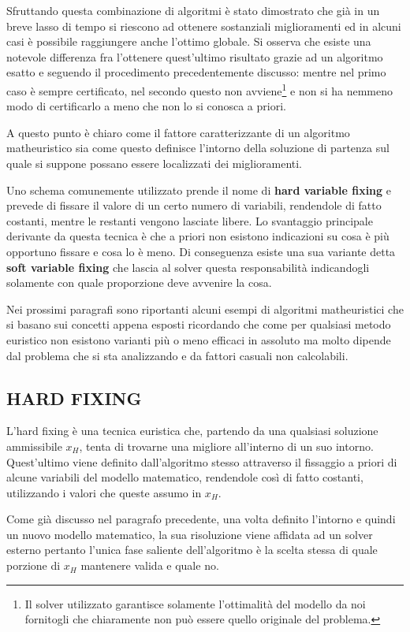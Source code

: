 \documentclass[11pt]{article}
\begin{document}
Sfruttando questa combinazione di algoritmi è stato dimostrato che già in un breve lasso di tempo si riescono ad ottenere sostanziali miglioramenti ed in alcuni casi è possibile raggiungere anche l'ottimo globale. Si osserva che esiste una notevole differenza fra l'ottenere quest'ultimo risultato grazie ad un algoritmo esatto e seguendo il procedimento precedentemente discusso: mentre nel primo caso è sempre certificato, nel secondo questo non avviene\footnote{Il solver utilizzato garantisce solamente l'ottimalità del modello da noi fornitogli che chiaramente non può essere quello originale del problema.} e non si ha nemmeno modo di certificarlo a meno che non lo si conosca a priori.

A questo punto è chiaro come il fattore caratterizzante di un algoritmo matheuristico sia come questo definisce l'intorno della soluzione di partenza sul quale si suppone possano essere localizzati dei miglioramenti. 

Uno schema comunemente utilizzato prende il nome di \textbf{hard variable fixing} e prevede di fissare il valore di un certo numero di variabili, rendendole di fatto costanti, mentre le restanti vengono lasciate libere. Lo svantaggio principale derivante da questa tecnica è che a priori non esistono indicazioni su cosa è più opportuno fissare e cosa lo è meno. Di conseguenza esiste una sua variante detta \textbf{soft variable fixing} che lascia al solver questa responsabilità indicandogli solamente con quale proporzione deve avvenire la cosa.

Nei prossimi paragrafi sono riportanti alcuni esempi di algoritmi matheuristici che si basano sui concetti appena esposti ricordando che come per qualsiasi metodo euristico non esistono varianti più o meno efficaci in assoluto ma molto dipende dal problema che si sta analizzando e da fattori casuali non calcolabili.

\subsection*{HARD FIXING}

L'hard fixing è una tecnica euristica che, partendo da una qualsiasi soluzione ammissibile \textbf{$x_H$}, tenta di trovarne una migliore all'interno di un suo intorno. Quest'ultimo viene definito dall'algoritmo stesso attraverso il fissaggio a priori di alcune variabili del modello matematico, rendendole così di fatto costanti, utilizzando i valori che queste assumo in $x_H$. 

Come già discusso nel paragrafo precedente, una volta definito l'intorno e quindi un nuovo modello matematico, la sua risoluzione viene affidata ad un solver esterno pertanto l'unica fase saliente dell'algoritmo è la scelta stessa di quale porzione di $x_H$ mantenere valida e quale no. 
\end{document}
